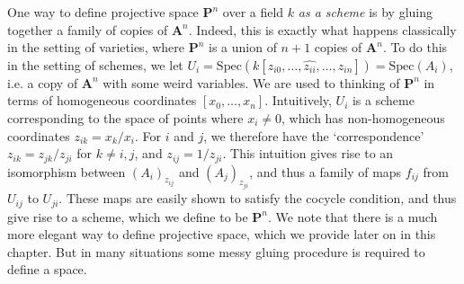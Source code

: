 \begin{example}
    One way to define projective space $\mathbf{P}^n$ over a field $k$ \emph{as a scheme} is by gluing together a family of copies of $\mathbf{A}^n$. Indeed, this is exactly what happens classically in the setting of varieties, where $\mathbf{P}^n$ is a union of $n+1$ copies of $\mathbf{A}^n$. To do this in the setting of schemes, we let $U_i = \text{Spec}(k[z_{i0}, \dots, \widehat{z_{ii}}, \dots, z_{in}]) = \text{Spec}(A_i)$, i.e. a copy of $\mathbf{A}^n$ with some weird variables. We are used to thinking of $\mathbf{P}^n$ in terms of homogeneous coordinates $[x_0,\dots,x_n]$. Intuitively, $U_i$ is a scheme corresponding to the space of points where $x_i \neq 0$, which has non-homogeneous coordinates $z_{ik} = x_k/x_i$. For $i$ and $j$, we therefore have the `correspondence' $z_{ik} = z_{jk}/z_{ji}$ for $k \neq i,j$, and $z_{ij} = 1/z_{ji}$. This intuition gives rise to an isomorphism between $(A_i)_{z_{ij}}$ and $(A_j)_{z_{ji}}$, and thus a family of maps $f_{ij}$ from $U_{ij}$ to $U_{ji}$. These maps are easily shown to satisfy the cocycle condition, and thus give rise to a scheme, which we define to be $\mathbf{P}^n$. We note that there is a much more elegant way to define projective space, which we provide later on in this chapter. But in many situations some messy gluing procedure is required to define a space.
\end{example}

